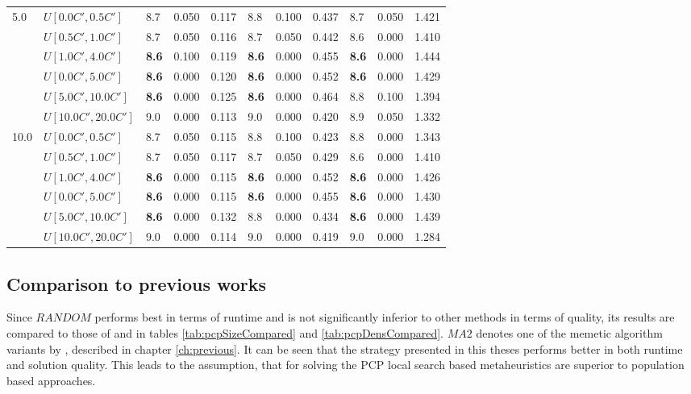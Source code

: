 \begin{table}[h]
{\begin{tabular}{|l|l||l|l|l||l|l|l||l|l|l|}
      \hline\hline
      \multirow{6}{*}{5.0} & $U[0.0C',0.5C']$ & 8.7 & 0.050 & 0.117 & 8.8 & 0.100 & 0.437 & 8.7 & 0.050 & 1.421 \\
       & $U[0.5C',1.0C']$ & 8.7 & 0.050 & 0.116 & 8.7 & 0.050 & 0.442 & 8.6 & 0.000 & 1.410 \\
       & $U[1.0C',4.0C']$ & \textbf{8.6} & 0.100 & 0.119 & \textbf{8.6} & 0.000 & 0.455 & \textbf{8.6} & 0.000 & 1.444 \\
       & $U[0.0C',5.0C']$ & \textbf{8.6} & 0.000 & 0.120 & \textbf{8.6} & 0.000 & 0.452 & \textbf{8.6} & 0.000 & 1.429 \\
       & $U[5.0C',10.0C']$ & \textbf{8.6} & 0.000 & 0.125 & \textbf{8.6} & 0.000 & 0.464 & 8.8 & 0.100 & 1.394 \\
       & $U[10.0C',20.0C']$ & 9.0 & 0.000 & 0.113 & 9.0 & 0.000 & 0.420 & 8.9 & 0.050 & 1.332 \\
      \hline\hline
      \multirow{6}{*}{10.0} & $U[0.0C',0.5C']$ & 8.7 & 0.050 & 0.115 & 8.8 & 0.100 & 0.423 & 8.8 & 0.000 & 1.343 \\
       & $U[0.5C',1.0C']$ & 8.7 & 0.050 & 0.117 & 8.7 & 0.050 & 0.429 & 8.6 & 0.000 & 1.410 \\
       & $U[1.0C',4.0C']$ & \textbf{8.6} & 0.000 & 0.115 & \textbf{8.6} & 0.000 & 0.452 & \textbf{8.6} & 0.000 & 1.426 \\
       & $U[0.0C',5.0C']$ & \textbf{8.6} & 0.000 & 0.115 & \textbf{8.6} & 0.000 & 0.455 & \textbf{8.6} & 0.000 & 1.430 \\
       & $U[5.0C',10.0C']$ & \textbf{8.6} & 0.000 & 0.132 & 8.8 & 0.000 & 0.434 & \textbf{8.6} & 0.000 & 1.439 \\
       & $U[10.0C',20.0C']$ & 9.0 & 0.000 & 0.114 & 9.0 & 0.000 & 0.419 & 9.0 & 0.000 & 1.284 \\
      \hline
      \end{tabular}
      }
      \label{tab:pcpn120RecoloredTT}\end{table}

\clearpage

\subsection{Comparison to previous works}
Since $\mathit{RANDOM}$ performs best in terms of runtime and is not significantly inferior to other methods in terms of quality, its results are compared to those of \cite{frota-07} and \cite{pop-13} in tables \ref{tab:pcpSizeCompared} and \ref{tab:pcpDensCompared}. $\mathit{MA2}$ denotes one of the memetic algorithm variants by \cite{pop-13}, described in chapter \ref{ch:previous}. It can be seen that the strategy presented in this theses performs better in both runtime and solution quality. This leads to the assumption, that for solving the PCP local search based metaheuristics are superior to population based approaches.\\

